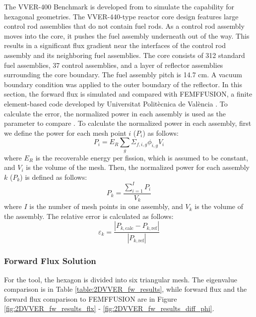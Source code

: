 The VVER-400 Benchmark is developed from \cite{chaoConformalMappingHexagonal1995} to simulate the capability for hexagonal geometries. The VVER-440-type reactor core design features large control rod assemblies that do not contain fuel rods. As a control rod assembly moves into the core, it pushes the fuel assembly underneath out of the way. This results in a significant flux gradient near the interfaces of the control rod assembly and its neighboring fuel assemblies. The core consists of 312 standard fuel assemblies, 37 control assemblies, and a layer of reflector assemblies surrounding the core boundary. The fuel assembly pitch is 14.7 cm. A vacuum boundary condition was applied to the outer boundary of the reflector. In this section, the forward flux is simulated and compared with FEMFFUSION, a finite element-based code developed by Universitat Politècnica de València \cite{vidal-ferrandizFEMFFUSIONFiniteElement2023}. To calculate the error, the normalized power in each assembly is used as the parameter to compare \cite{vidal-ferrandizMovingMeshesSolve2016}. To calculate the normalized power in each assembly, first we define the power for each mesh point $i$ ($P_i$) as follows:
\begin{equation}
    P_i = E_R \sum_g \Sigma_{f,i,g} \phi_{i,g} V_i
\end{equation}
where $E_R$ is the recoverable energy per fission, which is assumed to be constant, and $V_i$ is the volume of the mesh. Then, the normalized power for each assembly $k$ ($P_k$) is defined as follows:
\begin{equation}
    P_k = \frac{\sum_{i=1}^I P_i}{V_k}
\end{equation}
where $I$ is the number of mesh points in one assembly, and $V_k$ is the volume of the assembly. The relative error is calculated as follows:
\begin{equation}
    \varepsilon_k = \frac{|P_{k, \text{calc}}-P_{k, \text{ref}}|}{|P_{k, \text{ref}}|}
\end{equation}

\subsubsection{Forward Flux Solution}

For the tool, the hexagon is divided into six triangular mesh. The eigenvalue comparison is in Table \ref{table:2DVVER_fw_results}, while forward flux and the forward flux comparison to FEMFFUSION are in Figure \ref{fig:2DVVER_fw_results_flx} - \ref{fig:2DVVER_fw_results_diff_phi}.

